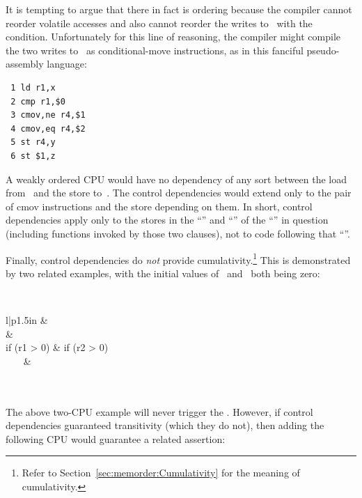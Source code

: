It is tempting to argue that there in fact is ordering because the
compiler cannot reorder volatile accesses and also cannot reorder
the writes to~ with the condition.
Unfortunately for this line
of reasoning, the compiler might compile the two writes to~ as
conditional-move instructions, as in this fanciful pseudo-assembly
language:

\vspace{5pt}
\begin{minipage}[t]{\columnwidth}
\scriptsize
\begin{verbatim}
 1 ld r1,x
 2 cmp r1,$0
 3 cmov,ne r4,$1
 4 cmov,eq r4,$2
 5 st r4,y
 6 st $1,z
\end{verbatim}
\end{minipage}
\vspace{5pt}

A weakly ordered CPU would have no dependency of any sort between the load
from~ and the store to~.
The control dependencies would extend
only to the pair of cmov instructions and the store depending on them.
In short, control dependencies apply only to the stores in the ``''
and ``'' of the ``'' in question (including functions
invoked by those two clauses), not to code following that ``''.

Finally, control dependencies do \emph{not} provide cumulativity.\footnote{
	Refer to Section~\ref{sec:memorder:Cumulativity} for
	the meaning of cumulativity.}
This is demonstrated by two related examples, with the initial values
of~ and~ both being zero:

\vspace{5pt}
\begin{minipage}[t]{\columnwidth}
\tt
\scriptsize
\begin{tabular}{l|p{1.5in}}
	 &	\nf{CPU 1} \\
	\hline
	 &
		\tco{r2 = READ_ONCE(y);} \\
	if (r1 > 0) &
		if (r2 > 0) \\
	~~~ &
		~~~\tco{WRITE_ONCE(x, 1);} \\
	 \\
	 \\
\end{tabular}
\end{minipage}
\vspace{5pt}

The above two-CPU example will never trigger the .
However, if control dependencies guaranteed transitivity (which they do
not), then adding the following CPU would guarantee a related assertion:


